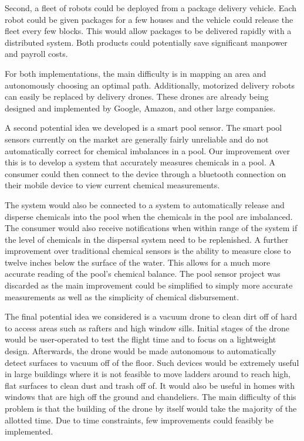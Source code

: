 \documentclass[11pt]{IEEEtran}
\begin{document}
		Second, a fleet of robots could be deployed from a package delivery vehicle. Each robot could be given packages for a few houses and the vehicle could release the fleet every few blocks. This would allow packages to be delivered rapidly with a distributed system. Both products could potentially save significant manpower and payroll costs.

		For both implementations, the main difficulty is in mapping an area and autonomously choosing an optimal path. Additionally, motorized delivery robots can easily be replaced by delivery drones. These drones are already being designed and implemented by Google, Amazon, and other large companies. 

		A second potential idea we developed is a smart pool sensor. The smart pool sensors currently on the market are generally fairly unreliable and do not automatically correct for chemical imbalances in a pool. Our improvement over this is to develop a system that accurately measures chemicals in a pool. A consumer could then connect to the device through a bluetooth connection on their mobile device to view current chemical measurements. 

		The system would also be connected to a system to automatically release and disperse chemicals into the pool when the chemicals in the pool are imbalanced. The consumer would also receive notifications when within range of the system if the level of chemicals in the dispersal system need to be replenished. A further improvement over traditional chemical sensors is the ability to measure close to twelve inches below the surface of the water. This allows for a much more accurate reading of the pool’s chemical balance. The pool sensor project was discarded as the main improvement could be simplified to simply more accurate measurements as well as the simplicity of chemical disbursement. 

		The final potential idea we considered is a vacuum drone to clean dirt off of hard to access areas such as rafters and high window sills. Initial stages of the drone would be user-operated to test the flight time and to focus on a lightweight design. Afterwards, the drone would be made autonomous to automatically detect surfaces to vacuum off of the floor. Such devices would be extremely useful in large buildings where it is not feasible to move ladders around to reach high, flat surfaces to clean dust and trash off of. It would also be useful in homes with windows that are high off the ground and chandeliers. The main difficulty of this problem is that the building of the drone by itself would take the majority of the allotted time. Due to time constraints, few improvements could feasibly be implemented. 
\end{document}
